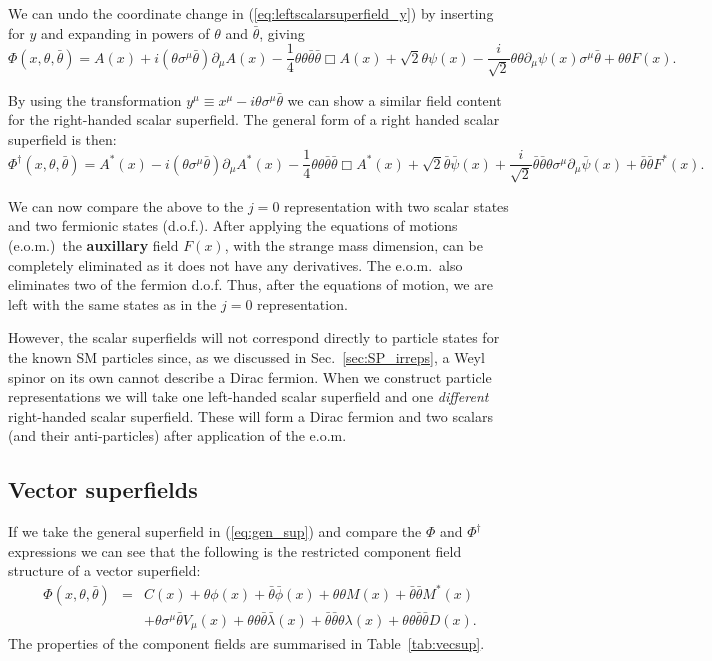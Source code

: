\documentclass[notes.tex]{subfiles}
\begin{document}
We can undo the coordinate change in (\ref{eq:leftscalarsuperfield_y}) by inserting for $y$ and expanding in powers of $\theta$ and $\bar{\theta}$, giving
\begin{equation}
\Phi(x, \theta, \bar{\theta}) = A(x) + i(\theta\sigma^\mu \bar{\theta})\partial_\mu A(x) - \frac{1}{4}\theta\theta\bar{\theta}\bar{\theta}\Box A(x) + \sqrt{2}\theta \psi(x) - \frac{i}{\sqrt{2}}\theta\theta\partial_\mu \psi(x)\sigma^\mu\bar{\theta} + \theta\theta F(x).
\label{eq:leftscalarsuperfield}
\end{equation}

By using the transformation  $y^\mu \equiv x^\mu - i\theta\sigma^\mu \bar{\theta}$ we can show a similar field content for the right-handed scalar superfield. The general form of a right handed scalar superfield is then:
\begin{equation}
\Phi^\dagger (x, \theta, \bar{\theta}) = A^*(x) - i(\theta\sigma^\mu \bar{\theta})\partial_\mu A^*(x) - \frac{1}{4}\theta\theta\bar{\theta}\bar{\theta}\Box A^*(x) + \sqrt{2}\bar{\theta}\bar{\psi}(x) + \frac{i}{\sqrt{2}}\bar{\theta}\bar{\theta}\theta \sigma^\mu\partial_\mu \bar{\psi}(x) +\bar{\theta}\bar{\theta} F^*(x).
\label{eq:rightscalarsuperfield}
\end{equation}

We can now compare the above to the $j=0$ representation with two scalar states and two fermionic states (d.o.f.).  After applying the equations of motions (e.o.m.)\ the {\bf auxillary} field $F(x)$, with the strange mass dimension, can be completely eliminated as it does not have any derivatives. The e.o.m.\ also eliminates two of the fermion d.o.f.  Thus, after the equations of motion, we are left with the same states as in the $j=0$ representation.

However, the scalar superfields will not correspond directly to particle states for the known SM particles since, as we discussed in Sec.~\ref{sec:SP_irreps}, a Weyl spinor on its own cannot describe a Dirac fermion. When we construct particle representations we will take one left-handed scalar superfield and one {\it different} right-handed scalar superfield. These will form a Dirac fermion and two scalars (and their anti-particles) after application of the e.o.m. 

\subsection{Vector superfields}
If we take the general superfield in (\ref{eq:gen_sup}) and compare the $\Phi$ and $\Phi^\dagger$ expressions we can see that the following is the restricted component field structure of a vector superfield:
\begin{eqnarray*}
\Phi(x, \theta, \bar{\theta}) &=& C(x) + \theta\phi(x) + \bar{\theta}\bar{\phi}(x) + \theta\theta M(x) + \bar{\theta}\bar{\theta}M^*(x) \\
&& + \theta \sigma^\mu \bar{\theta}V_\mu(x) + \theta \theta \bar{\theta}\bar{\lambda}(x) +\bar{\theta}\bar{\theta}\theta\lambda(x) + \theta\theta\bar{\theta}\bar{\theta}D(x).
\end{eqnarray*} 
The properties of the component fields  are summarised in Table~\ref{tab:vecsup}.
\end{document}
